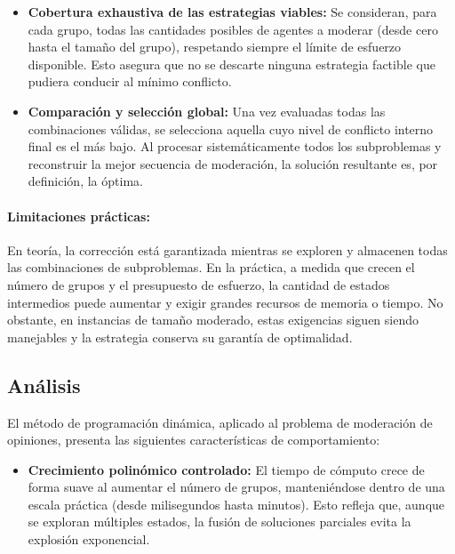 \documentclass[11pt,letter]{article}
\begin{document}
\begin{itemize}
\begin{itemize}
      \item \textbf{Cobertura exhaustiva de las estrategias viables:}
      Se consideran, para cada grupo, todas las cantidades posibles de agentes a moderar (desde cero hasta el tamaño del grupo), respetando siempre el límite de esfuerzo disponible. Esto asegura que no se descarte ninguna estrategia factible que pudiera conducir al mínimo conflicto.

      \item \textbf{Comparación y selección global:}
      Una vez evaluadas todas las combinaciones válidas, se selecciona aquella cuyo nivel de conflicto interno final es el más bajo. Al procesar sistemáticamente todos los subproblemas y reconstruir la mejor secuencia de moderación, la solución resultante es, por definición, la óptima.

    \end{itemize}

    \paragraph{Limitaciones prácticas:}

    En teoría, la corrección está garantizada mientras se exploren y almacenen todas las combinaciones de subproblemas. En la práctica, a medida que crecen el número de grupos y el presupuesto de esfuerzo, la cantidad de estados intermedios puede aumentar y exigir grandes recursos de memoria o tiempo. No obstante, en instancias de tamaño moderado, estas exigencias siguen siendo manejables y la estrategia conserva su garantía de optimalidad.

    \subsection{Análisis}

    El método de programación dinámica, aplicado al problema de moderación de opiniones, presenta las siguientes características de comportamiento:

        \begin{itemize}

    \item \textbf{Crecimiento polinómico controlado:}
    El tiempo de cómputo crece de forma suave al aumentar el número de grupos, manteniéndose dentro de una escala práctica (desde milisegundos hasta minutos). Esto refleja que, aunque se exploran múltiples estados, la fusión de soluciones parciales evita la explosión exponencial.



\end{itemize}
\end{itemize}
\end{document}
